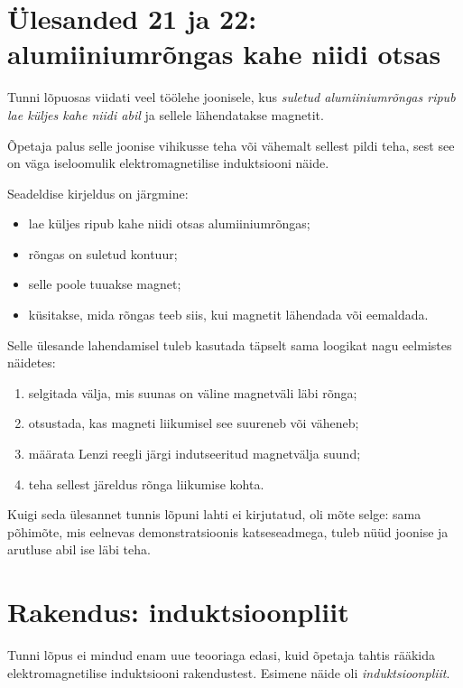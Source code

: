 \documentclass[a4paper,11pt]{article}
\begin{document}
\section{Ülesanded 21 ja 22: alumiiniumrõngas kahe niidi otsas}

Tunni lõpuosas viidati veel töölehe joonisele, kus \emph{suletud alumiiniumrõngas ripub lae küljes kahe niidi abil} ja sellele lähendatakse magnetit.

Õpetaja palus selle joonise vihikusse teha või vähemalt sellest pildi teha, sest see on väga iseloomulik elektromagnetilise induktsiooni näide.

Seadeldise kirjeldus on järgmine:

\begin{itemize}
    \item lae küljes ripub kahe niidi otsas alumiiniumrõngas;
    \item rõngas on suletud kontuur;
    \item selle poole tuuakse magnet;
    \item küsitakse, mida rõngas teeb siis, kui magnetit lähendada või eemaldada.
\end{itemize}

Selle ülesande lahendamisel tuleb kasutada täpselt sama loogikat nagu eelmistes näidetes:

\begin{enumerate}
    \item selgitada välja, mis suunas on väline magnetväli läbi rõnga;
    \item otsustada, kas magneti liikumisel see suureneb või väheneb;
    \item määrata Lenzi reegli järgi indutseeritud magnetvälja suund;
    \item teha sellest järeldus rõnga liikumise kohta.
\end{enumerate}

Kuigi seda ülesannet tunnis lõpuni lahti ei kirjutatud, oli mõte selge: sama põhimõte, mis eelnevas demonstratsioonis katseseadmega, tuleb nüüd joonise ja arutluse abil ise läbi teha.

\section{Rakendus: induktsioonpliit}

Tunni lõpus ei mindud enam uue teooriaga edasi, kuid õpetaja tahtis rääkida elektromagnetilise induktsiooni rakendustest. Esimene näide oli \emph{induktsioonpliit}.
\end{document}
